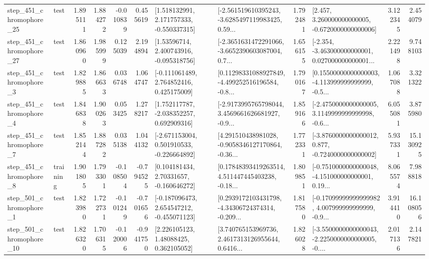\begin{tabular}{llrrrrllrlrr}
  step\_451\_chromophore\_25 &      test &      1.895111 &    1.884272 &     -0.010839 &  0.455619 &    [1.518132991, 2.171757333, -0.550337315] &  [-2.561519610395243, -3.6285497119983425, 0.59... &       1.792481 &    [2.457, 3.260000000000005, -0.6720000000000006] &            3.122345 &          2.454079 \\
  step\_451\_chromophore\_27 &      test &      1.860960 &    1.985999 &      0.125039 &  2.194894 &     [1.53596714, 2.400743916, -0.095318756] &  [-2.3651631472291066, -3.6652390603087004, 0.7... &       1.656155 &  [-2.354, -3.463000000000001, 0.027000000000001... &            2.221498 &          9.748103 \\
   step\_451\_chromophore\_3 &      test &      1.829885 &    1.866633 &      0.036748 &  1.064747 &    [-0.111061489, 2.764852416, 0.425175009] &  [0.11298331088927849, -4.499252516196584, -0.8... &       1.790167 &  [0.15500000000000003, -4.113999999999999, -0.5... &            1.067088 &          3.321322 \\
   step\_451\_chromophore\_4 &      test &      1.846838 &    1.900263 &      0.053425 &  1.278217 &    [1.752117787, -2.038352257, 0.692909316] &  [-2.9173995765798044, 3.4569661626681927, -0.9... &       1.859166 &  [-2.4750000000000005, 3.1149999999999998, -0.6... &            6.055081 &          3.875980 \\
   step\_451\_chromophore\_7 &      test &      1.852144 &    1.887282 &      0.035138 &  1.044132 &   [-2.671153004, 0.501910533, -0.226664892] &  [4.291510438981028, -0.9058346127170864, -0.36... &       1.772331 &  [-3.8760000000000012, 0.877, -0.7240000000000002] &            5.937331 &         15.130925 \\
   step\_451\_chromophore\_8 &  training &      1.901805 &    1.793301 &     -0.108504 & -0.794525 &     [0.104181434, 2.70331657, -0.160646272] &  [0.17848393419263514, 4.511447445403238, -0.18... &       1.809851 &  [-0.7510000000000048, -4.151000000000001, 0.19... &            8.065574 &          7.988818 \\
   step\_501\_chromophore\_1 &      test &      1.823980 &    1.722731 &     -0.101249 & -0.701656 &   [-0.187096473, 2.654547212, -0.455071123] &  [0.2939172103431798, -4.34306724374314, -0.209... &       1.817580 &  [-0.17099999999999982, 4.007999999999999, -0.9... &            3.914410 &         16.108056 \\
  step\_501\_chromophore\_10 &      test &      1.826320 &    1.706315 &     -0.120006 & -0.941750 &      [2.226105123, 1.48088425, 0.362105052] &  [3.740765153969736, 2.4617313126955644, 0.6416... &       1.826028 &  [-3.5500000000000043, -2.2250000000000005, -0.... &            2.017136 &          2.147821 \\

\end{tabular}
